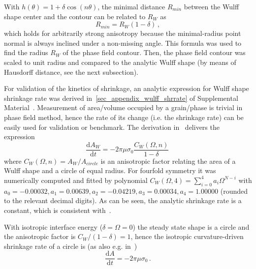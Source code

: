 With $h(\theta)=1+\delta\cos(n\theta)$, the minimal distance $R_{min}$ between the Wulff shape center and the contour can be related to $R_W$ as
\begin{equation} \label{eq_appdx_wulff_minradius}
	R_{min} = R_W(1-\delta) \,,
\end{equation}
which holds for arbitrarily strong anisotropy because the minimal-radius point normal is always inclined under a non-missing angle. This formula was used to find the radius $R_W$ of the phase field contour. Then, the phase field contour was scaled to unit radius and compared to the analytic Wulff shape (by means of Hausdorff distance, see the next subsection). 

For validation of the kinetics of shrinkage, an analytic expression for Wulff shape shrinkage rate was derived in~\ref{sec_appendix_wulff_shrrate} of Supplemental Material~\cite{Minar2021suppl}. Measurement of area/volume occupied by a grain/phase is trivial in phase field method, hence the rate of its change (i.e. the shrinkage rate) can be easily used for validation or benchmark. The derivation in~\cite{Minar2021suppl} delivers the expression
\begin{equation}\label{eq_wulff_shrrate}
	\frac{\mathrm{d}A_W}{\mathrm{d}t} = -2\pi\mu\sigma_0  \frac{C_W(\Omega,n)}{1-\delta} \,
\end{equation}
where $C_W(\Omega,n)=A_W/A_{circle}$ is an anisotropic factor relating the area of a Wulff shape and a circle of equal radius. For fourfold symmetry it was numerically computed and fitted by polynomial $C_W(\Omega,4)= \sum_{i=0}^4a_i\Omega^{N-i}$ with $a_0=-0.00032 ,a_1=0.00639 ,a_2=-0.04219 , a_3=0.00034 , a_4=1.00000$ (rounded to the relevant decimal digits). As can be seen, the analytic shrinkage rate is a constant, which is consistent with~\cite{Taylor1998}.

With isotropic interface energy ($\delta=\Omega=0$) the steady state shape is a circle and the anisotropic factor is $C_W/(1-\delta)=1$, hence the isotropic curvature-driven shrinkage rate of a circle is (as also e.g. in~\cite{Moelans2009})
\begin{equation} \label{eq_iso_shrrate}
	\frac{\mathrm{d}A}{\mathrm{d}t} = -2\pi\mu\sigma_0 \,.
\end{equation}

